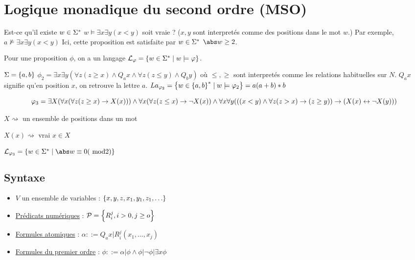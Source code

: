 \section{Logique monadique du second ordre (MSO)}

Est-ce qu'il existe $w \in \Sigma^{*}$ \tq $w {\models} \exists x \exists y (x < y)$ soit vraie ?
($x,y$ sont interpretés comme des positions dans le mot $w$.)
Par exemple, $a {\nvDash} \exists x \exists y (x < y)$
Ici, cette proposition est satisfaite par $w \in \Sigma^{*}$ \ssi $\abs w \geq 2$.


Pour une proposition $\phi$, on a un langage $\mathcal{L}_\varphi = \left\{w \in \Sigma^{*} \mid w \models \varphi\right\}$.


\begin{exemple}
	$\Sigma = \left\{a,b\right\}$
	$\phi_2 = \exists x \exists y (\forall z (z \geq x) \land Q_a x \land \forall z (z \leq y) \land Q_b y)$
	où $\leq, \geq$ sont interpretés comme les relations habituelles sur $N$.
	$Q_a x$ signifie qu'en position $x$, on retrouve la lettre $a$.
	$La_{\varphi_2} = \left\{w \in \left\{a,b\right\}^{*} \mid w \models \varphi_2\right\} = a(a+b)*b$
\end{exemple}


\begin{exemple}
	$$\varphi_3 = \exists X (\forall x (\forall z (z \geq x) \rightarrow X(x))) \land \forall x (\forall z (z \leq x) \rightarrow \lnot X(x)) \land
		\forall x \forall y (((x < y) \land \forall z(z > x) \rightarrow (z \geq y)) \rightarrow (X (x) \leftrightarrow \lnot X(y)))$$


	$X \rightsquigarrow $ un ensemble de positions dans un mot


	$X (x)\rightsquigarrow$ vrai \ssi $x \in X$


	$\La_{\phi_3} = \setdef {w \in \mots} {\abs w \equiv 0 (\text { mod} 2)}$
\end{exemple}

\subsection{Syntaxe}

\begin{definition} 
	\begin{itemize}
		\item $V$ un ensemble de variables : $\left\{x,y,z,x_1,y_1,z_1, \ldots\right\}$
		\item \underline{Prédicats numériques} :  $\mathcal{P} = \left\{R_i^j, i > 0, j \geq o\right\}$
		\item \underline{Formules atomiques} : $\alpha ::= Q_a x | R_i^j(x_1, \ldots, x_j)$
		\item \underline{Formules du premier ordre} : $\phi ::= \alpha | \phi \land \phi | \lnot \phi | \exists x \phi$
	\end{itemize}
\end{definition}


